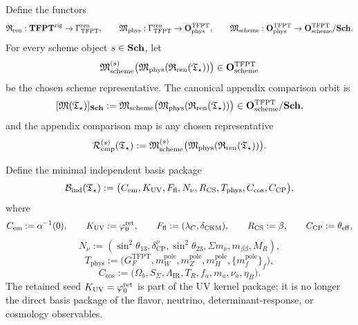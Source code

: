 \begin{definition}
\label{def:canonical-measurement-orbit}
Define the functors
\[
\mathfrak R_{\mathrm{ren}}:\mathbf{TFPT}^{\mathrm{rig}}\to\Gamma_{\mathrm{TFPT}}^{\mathrm{ren}},
\qquad
\mathfrak M_{\mathrm{phys}}:\Gamma_{\mathrm{TFPT}}^{\mathrm{ren}}\to\mathbf O_{\mathrm{phys}}^{\mathrm{TFPT}},
\qquad
\mathfrak M_{\mathrm{scheme}}:\mathbf O_{\mathrm{phys}}^{\mathrm{TFPT}}\to\mathbf O_{\mathrm{scheme}}^{\mathrm{TFPT}}/\mathbf{Sch}.
\]
For every scheme object $s\in\mathbf{Sch}$, let
\[
\mathfrak M_{\mathrm{scheme}}^{(s)}\bigl(\mathfrak M_{\mathrm{phys}}(\mathfrak R_{\mathrm{ren}}(\mathfrak T_{\star}))\bigr)\in\mathbf O_{\mathrm{scheme}}^{\mathrm{TFPT}}
\]
be the chosen scheme representative. The canonical appendix comparison orbit is
\[
[\mathfrak M(\mathfrak T_{\star})]_{\mathbf{Sch}}
:=
\mathfrak M_{\mathrm{scheme}}\bigl(\mathfrak M_{\mathrm{phys}}(\mathfrak R_{\mathrm{ren}}(\mathfrak T_{\star}))\bigr)
\in \mathbf O_{\mathrm{scheme}}^{\mathrm{TFPT}}/\mathbf{Sch},
\]
and the appendix comparison map is any chosen representative
\[
\mathcal R_{\mathrm{cmp}}^{(s)}(\mathfrak T_{\star}):=
\mathfrak M_{\mathrm{scheme}}^{(s)}\bigl(\mathfrak M_{\mathrm{phys}}(\mathfrak R_{\mathrm{ren}}(\mathfrak T_{\star}))\bigr).
\]
\end{definition}

\begin{definition}
\label{def:minimal-observable-basis}
Define the minimal independent basis package
\[
\mathcal B_{\mathrm{ind}}(\mathfrak T_{\star}):=
\bigl(
C_{\mathrm{em}},
K_{\mathrm{UV}},
F_{\mathrm{fl}},
N_{\nu},
R_{\mathrm{CS}},
T_{\mathrm{phys}},
C_{\mathrm{cos}},
C_{\mathrm{CP}}
\bigr),
\]
where
\[
C_{\mathrm{em}}:=\alpha^{-1}(0),
\qquad
K_{\mathrm{UV}}:=\varphi_0^{\mathrm{ret}},
\qquad
F_{\mathrm{fl}}:=(\lambda_C,\delta_{\mathrm{CKM}}),
\qquad
R_{\mathrm{CS}}:=\beta,
\qquad
C_{\mathrm{CP}}:=\theta_{\mathrm{eff}},
\]
\[
N_{\nu}:=(\sin^2\theta_{13},\delta_{\mathrm{CP}}^\nu,\sin^2\theta_{23},\Sigma m_\nu,m_{\beta\beta},M_R),
\]
\[
T_{\mathrm{phys}}
:=
\bigl(
G_F^{\mathrm{TFPT}},
m_W^{\mathrm{pole}},
m_Z^{\mathrm{pole}},
m_H^{\mathrm{pole}},
\{m_f^{\mathrm{pole}}\}_f
\bigr),
\]
\[
C_{\mathrm{cos}}
:=
\bigl(
\Omega_b,S_\Sigma,\Lambda_{\mathrm{IR}},T_R,f_a,m_a,\nu_a,\eta_B
\bigr).
\]
The retained seed $K_{\mathrm{UV}}=\varphi_0^{\mathrm{ret}}$ is part of the UV kernel package; it is no longer the
direct basis package of the flavor, neutrino, determinant-response, or cosmology observables.
\end{definition}

